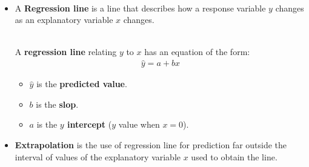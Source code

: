 \documentclass[Main.tex]{subfiles}
\begin{document}
	\begin{exercise}[Regressions] \hfill \\
			\begin{itemize}
				\item A \textbf{Regression line} is a line that describes how a response variable $y$ changes as an explanatory variable $x$ changes.
				
					\begin{definition}\hfill \\						
						A \textbf{regression line} relating $y$ to $x$ has an equation of the form:
							\begin{subequations}
								\begin{align}
								\hat{y}=a+bx
								\end{align}
							\end{subequations}
						\begin{itemize}
							\item $\hat{y}$ is the \textbf{predicted value}.
							\item $b$ is the \textbf{slop}.
							\item $a$ is the \textbf{$y$ intercept} ($y$ value when $x=0$).\hfill
						\end{itemize}
					\end{definition}\hfill %
				\item \textbf{Extrapolation} is the use of regression line for prediction far outside the interval of values of the explanatory variable $x$ used to obtain the line.
			\end{itemize}		
	\end{exercise}
	
\end{document}
